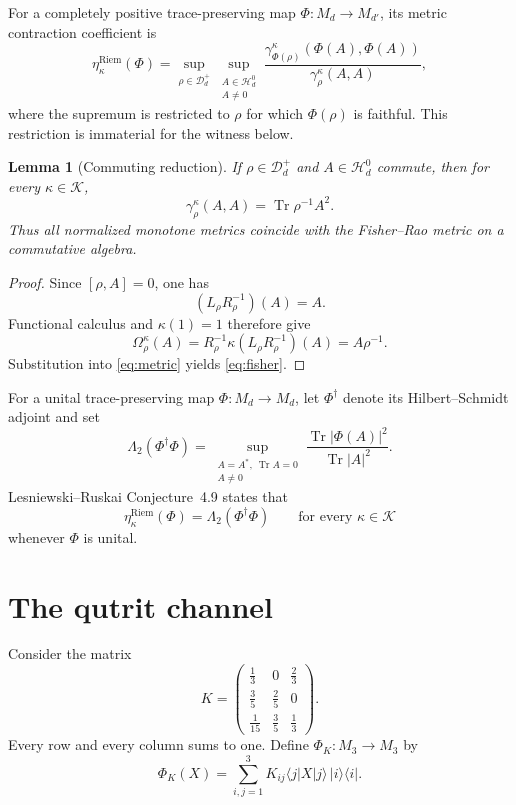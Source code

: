 \documentclass[11pt]{amsart}
\newtheorem{lemma}[theorem]{Lemma}
\theoremstyle{definition}
\theoremstyle{remark}
\DeclareMathOperator{\Tr}{Tr}
\newcommand{\Dplus}{\mathcal D_d^{+}}
\newcommand{\Htr}{\mathcal H_d^{0}}
\newcommand{\Riem}{\mathrm{Riem}}
\newcommand{\PhiK}{\Phi_K}
\begin{document}
For a completely positive trace-preserving map $\Phi:M_d\to M_{d'}$, its metric contraction coefficient is
\begin{equation}\label{eq:eta}
 \eta_\kappa^{\Riem}(\Phi)
 =\sup_{\rho\in\Dplus}
  \sup_{\substack{A\in\Htr\\A\ne0}}
 \frac{\gamma_{\Phi(\rho)}^\kappa(\Phi(A),\Phi(A))}
      {\gamma_\rho^\kappa(A,A)},
\end{equation}
where the supremum is restricted to $\rho$ for which $\Phi(\rho)$ is faithful. This restriction is immaterial for the witness below.

\begin{lemma}[Commuting reduction]\label{lem:commuting}
If $\rho\in\Dplus$ and $A\in\Htr$ commute, then for every $\kappa\in\mathcal K$,
\begin{equation}\label{eq:fisher}
 \gamma_\rho^\kappa(A,A)=\Tr \rho^{-1}A^2.
\end{equation}
Thus all normalized monotone metrics coincide with the Fisher--Rao metric on a commutative algebra.
\end{lemma}

\begin{proof}
Since $[\rho,A]=0$, one has
\[
 (L_\rho R_\rho^{-1})(A)=A.
\]
Functional calculus and $\kappa(1)=1$ therefore give
\[
 \Omega_\rho^\kappa(A)
 =R_\rho^{-1}\kappa(L_\rho R_\rho^{-1})(A)
 =A\rho^{-1}.
\]
Substitution into \eqref{eq:metric} yields \eqref{eq:fisher}.
\end{proof}

For a unital trace-preserving map $\Phi:M_d\to M_d$, let $\Phi^\dagger$ denote its Hilbert--Schmidt adjoint and set
\begin{equation}\label{eq:lambda2def}
 \Lambda_2(\Phi^\dagger\Phi)
 =\sup_{\substack{A=A^*,\ \Tr A=0\\A\ne0}}
 \frac{\Tr|\Phi(A)|^2}{\Tr|A|^2}.
\end{equation}
Lesniewski--Ruskai Conjecture~4.9 states that
\begin{equation}\label{eq:conjecture}
 \eta_\kappa^{\Riem}(\Phi)
 =\Lambda_2(\Phi^\dagger\Phi)
 \qquad\text{for every }\kappa\in\mathcal K
\end{equation}
whenever $\Phi$ is unital.

\section{The qutrit channel}

Consider the matrix
\begin{equation}\label{eq:K}
 K=
 \begin{pmatrix}
  \frac13&0&\frac23\\[1mm]
  \frac35&\frac25&0\\[1mm]
  \frac1{15}&\frac35&\frac13
 \end{pmatrix}.
\end{equation}
Every row and every column sums to one. Define $\PhiK:M_3\to M_3$ by
\begin{equation}\label{eq:channel}
 \PhiK(X)
 =\sum_{i,j=1}^3
 K_{ij}\langle j|X|j\rangle\,|i\rangle\langle i|.
\end{equation}
\end{document}
